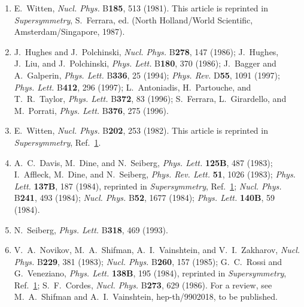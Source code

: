 \begin{enumerate}
  \item {}\label{ch29-ref-1}
  E.~Witten, \textit{Nucl. Phys.} B\textbf{185}, 513 (1981). This
  article is reprinted in \textit{Supersymmetry}, S.~Ferrara, ed.
  (North Holland/World Scientific, Amsterdam/Singapore, 1987).

  \item[1a.] \label{ch29-ref-1a}
  J.~Hughes and J.~Polchinski, \textit{Nucl. Phys.} B\textbf{278}, 147
  (1986); J.~Hughes, J.~Liu, and J.~Polchinski, \textit{Phys. Lett.}
  B\textbf{180}, 370 (1986); J.~Bagger and A.~Galperin,
  \textit{Phys. Lett.} B\textbf{336}, 25 (1994); \textit{Phys. Rev.}
  D\textbf{55}, 1091 (1997); \textit{Phys. Lett.} B\textbf{412}, 296
  (1997); L.~Antoniadis, H.~Partouche, and T.~R.~Taylor,
  \textit{Phys. Lett.} B\textbf{372}, 83 (1996); S.~Ferrara,
  L.~Girardello, and M.~Porrati, \textit{Phys. Lett.} B\textbf{376},
  275 (1996).

  \item {}\label{ch29-ref-2}
  E.~Witten, \textit{Nucl. Phys.} B\textbf{202}, 253 (1982). This
  article is reprinted in \textit{Supersymmetry},
  Ref.~\hyperref[ch29-ref-1]{1}.

  \item {}\label{ch29-ref-3}
  A.~C.~Davis, M.~Dine, and N.~Seiberg, \textit{Phys. Lett.}
  \textbf{125B}, 487 (1983); I.~Affleck, M.~Dine, and N.~Seiberg,
  \textit{Phys. Rev. Lett.} \textbf{51}, 1026 (1983);
  \textit{Phys. Lett.} \textbf{137B}, 187 (1984), reprinted in
  \textit{Supersymmetry}, Ref.~\hyperref[ch29-ref-1]{1};
  \textit{Nucl. Phys.} B\textbf{241}, 493 (1984);
  \textit{Nucl. Phys.} B\textbf{52}, 1677 (1984);
  \textit{Phys. Lett.} \textbf{140B}, 59 (1984).

  \item {}\label{ch29-ref-4}
  N.~Seiberg, \textit{Phys. Lett.} B\textbf{318}, 469 (1993).

  \item {}\label{ch29-ref-5}
  V.~A.~Novikov, M.~A.~Shifman, A.~I.~Vainshtein, and V.~I.~Zakharov,
  \textit{Nucl. Phys.} B\textbf{229}, 381 (1983);
  \textit{Nucl. Phys.} B\textbf{260}, 157 (1985); G.~C.~Rossi and
  G.~Veneziano, \textit{Phys. Lett.} \textbf{138B}, 195 (1984),
  reprinted in \textit{Supersymmetry},
  Ref.~\hyperref[ch29-ref-1]{1}; S.~F.~Cordes,
  \textit{Nucl. Phys.} B\textbf{273}, 629 (1986). For a review, see
  M.~A.~Shifman and A.~I.~Vainshtein, hep-th/9902018, to be published.


\end{enumerate}
